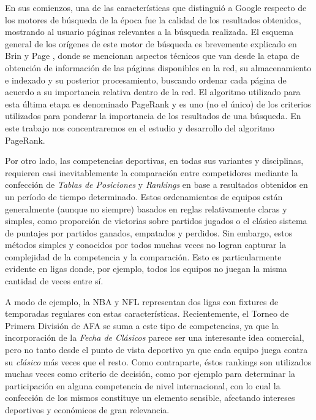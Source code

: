 En sus comienzos, una de las caracter\'isticas que distingui\'o a Google respecto de los motores de b\'usqueda de la \'epoca fue la calidad de los 
resultados obtenidos, mostrando al usuario p\'aginas relevantes a la b\'usqueda realizada. El esquema general de los or\'igenes de este motor de 
b\'usqueda es brevemente explicado en Brin y Page \cite{Brin1998}, donde se mencionan aspectos t\'ecnicos que van desde la etapa de obtenci\'on de
informaci\'on de las p\'aginas disponibles en la red, su almacenamiento e indexado y su posterior procesamiento, buscando ordenar cada p\'agina de 
acuerdo a su importancia relativa dentro de la red. El algoritmo utilizado para esta \'ultima etapa es denominado PageRank y es uno (no el \'unico) 
de los criterios utilizados para ponderar la importancia de los resultados de una b\'usqueda. En este trabajo nos concentraremos en el estudio y 
desarrollo del algoritmo PageRank.

Por otro lado, las competencias deportivas, en todas sus variantes y disciplinas, requieren casi inevitablemente la comparaci\'on entre competidores
mediante la confecci\'on de \emph{Tablas de Posiciones} y \emph{Rankings} en base a resultados obtenidos en un per\'iodo de tiempo determinado. 
Estos ordenamientos de equipos est\'an generalmente (aunque no siempre) basados en reglas relativamente claras y simples, como proporci\'on 
de victorias sobre partidos jugados o el cl\'asico sistema de puntajes por partidos ganados, empatados y perdidos. Sin embargo, estos m\'etodos
simples y conocidos por todos muchas veces no logran capturar la complejidad de la competencia y la comparaci\'on. Esto es particularmente
evidente en ligas donde, por ejemplo, todos los equipos no juegan la misma cantidad de veces entre s\'i.

A modo de ejemplo, la NBA y NFL representan dos ligas con fixtures de temporadas regulares con estas caracter\'isticas. Recientemente, el Torneo de 
Primera Divisi\'on de AFA se suma a este tipo de competencias, ya que la incorporaci\'on de la \emph{Fecha de Cl\'asicos} parece ser una interesante 
idea comercial, pero no tanto desde el punto de vista deportivo ya que cada equipo juega contra su \emph{cl\'asico} m\'as veces que el resto. 
Como contraparte, \'estos rankings son utilizados muchas veces como criterio de decisi\'on, como por ejemplo para determinar la participaci\'on en 
alguna competencia de nivel internacional, con lo cual la confecci\'on de los mismos constituye un elemento sensible, afectando intereses deportivos 
y econ\'omicos de gran relevancia.


